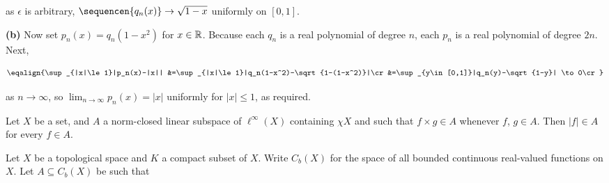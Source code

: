 { 
      
\noindent as $\epsilon$ is arbitrary, 
$\sequencen{q_n(x)}\to\sqrt{1-x}$ uniformly on $[0,1]$. 
      
\medskip 
      
{\bf (b)} Now set $p_n(x)=q_n(1-x^2)$ for $x\in\Bbb R$.   Because each 
$q_n$ is a real polynomial of degree $n$, each $p_n$ is a real 
polynomial of degree $2n$.   Next, 
      
$$\eqalign{\sup_{|x|\le 1}|p_n(x)-|x|| 
&=\sup_{|x|\le 1}|q_n(1-x^2)-\sqrt{1-(1-x^2)}|\cr 
&=\sup_{y\in[0,1]}|q_n(y)-\sqrt{1-y}| 
\to 0\cr}$$ 
      
\noindent as $n\to\infty$, so $\lim_{n\to\infty}p_n(x)=|x|$ uniformly 
for $|x|\le 1$, as required. 
}%
      
 Let $X$ be a set, and $A$ a norm-closed linear 
subspace of $\ell^{\infty}(X)$ containing $\chi X$ and such that 
$f\times g\in A$ whenever $f$, $g\in A$.   Then $|f|\in A$ for every 
$f\in A$. 
      
      
 Let $X$ be a 
topological space and $K$ a compact subset of $X$.   Write $C_b(X)$ for 
the space of all bounded continuous real-valued functions on $X$.   Let 
$A\subseteq C_b(X)$ be such that 
      
      
      
      
